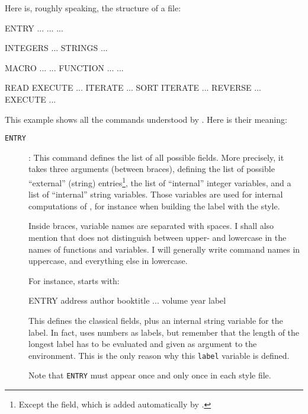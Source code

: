 Here is, roughly speaking, the structure of a  file:

\begin{myexv}
\begin{verbatimtab}
ENTRY 
  {  ...  }
  {  ...  }
  {  ...  }

INTEGERS {  ...  }
STRINGS {  ...  }

MACRO {  ...  }{  ...  }
FUNCTION {  ...  }{  ...  }

READ
EXECUTE {  ...  }
ITERATE {  ...  }
SORT
ITERATE {  ...  }
REVERSE {  ...  }
EXECUTE {  ...  }
\end{verbatimtab}
\end{myexv}

This example shows all the 
commands understood by \bt. 
Here is their meaning:
\begin{description}
\item[\texttt{ENTRY}]: This command defines
  the list of all possible fields. More precisely, it takes three arguments
  (between braces), defining the list of possible ``external'' (string)
  entries\footnote{Except the  field, which is added
  automatically by \bt.}, the  list of ``internal'' integer variables, and a
  list of ``internal'' string variables. Those variables are used for internal
  computations of \bt, for instance when building the label with the
   style. 

  Inside braces, variable names are
  separated with spaces. I shall also mention that \bt does not distinguish
  between upper- and lowercase in the names of functions and variables. I will
  generally write command names in uppercase, and everything else in lowercase.

  For instance,  starts with:
\begin{myexv}
\begin{verbatimtab}
ENTRY
  { address
    author
    booktitle
    ...
    volume
    year
  }
  {}
  { label }
\end{verbatimtab}
\end{myexv}
\noindent This defines the classical fields, plus an internal 
string variable for the label. In fact,  uses numbers as labels,
but remember that the length of the longest label has to be evaluated and
given as argument to the  environment. This is the only
reason why this \verb+label+ variable is defined.

Note that \texttt{ENTRY} must appear once and only once in each style file. 


\end{description}
